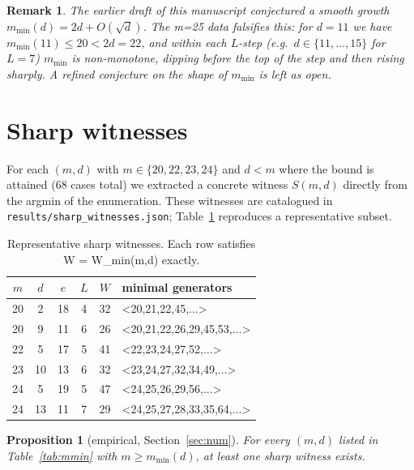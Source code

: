 \documentclass[11pt,a4paper]{article}
\newtheorem{proposition}[theorem]{Proposition}
\newtheorem{remark}[theorem]{Remark}
\begin{document}
\begin{remark}
The earlier draft of this manuscript conjectured a smooth growth
$m_{\min}(d) = 2d + O(\sqrt d)$. The m=25 data falsifies this: for
$d=11$ we have $m_{\min}(11) \le 20 < 2d = 22$, and within each
$L$-step (e.g.\ $d \in \{11,\ldots,15\}$ for $L=7$) $m_{\min}$ is
non-monotone, dipping before the top of the step and then rising
sharply. A refined conjecture on the shape of $m_{\min}$ is left as
open.
\end{remark}

\section{Sharp witnesses}

For each $(m,d)$ with $m \in \{20,22,23,24\}$ and $d < m$
where the bound is attained ($68$ cases total) we extracted a
concrete witness $S(m,d)$ directly from the argmin of the enumeration.
These witnesses are catalogued in
\texttt{results/sharp\_witnesses.json}; Table~\ref{tab:witnesses}
reproduces a representative subset.

\begin{table}[h]
\centering
\small
\begin{tabular}{cccccl}
\toprule
$m$ & $d$ & $e$ & $L$ & $W$ & minimal generators\\
\midrule
20 & 2 & 18 & 4 & 32 & {\textless}20,21,22,45,...{\textgreater}\\
20 & 9 & 11 & 6 & 26 & {\textless}20,21,22,26,29,45,53,...{\textgreater}\\
22 & 5 & 17 & 5 & 41 & {\textless}22,23,24,27,52,...{\textgreater}\\
23 &10 & 13 & 6 & 32 & {\textless}23,24,27,32,34,49,...{\textgreater}\\
24 & 5 & 19 & 5 & 47 & {\textless}24,25,26,29,56,...{\textgreater}\\
24 &13 & 11 & 7 & 29 & {\textless}24,25,27,28,33,35,64,...{\textgreater}\\
\bottomrule
\end{tabular}
\caption{Representative sharp witnesses. Each row satisfies
W = W\_min(m,d) exactly.}
\label{tab:witnesses}
\end{table}

\begin{proposition}[empirical, Section~\ref{sec:num}]
For every $(m,d)$ listed in Table~\ref{tab:mmin} with
$m \ge m_{\min}(d)$, at least one sharp witness exists.
\end{proposition}
\end{document}
